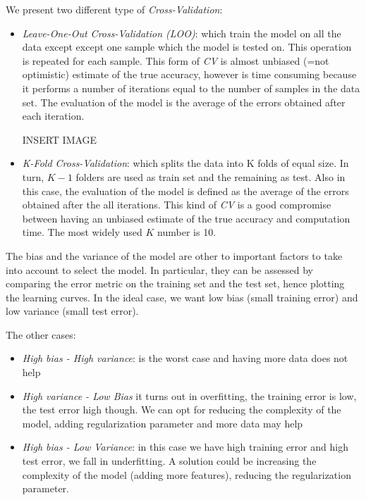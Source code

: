 We present two different type of \emph{Cross-Validation}:
\begin{itemize}
\item \emph{Leave-One-Out Cross-Validation (LOO)}: which train the model on all the data except except one sample which the model is tested on. This operation is repeated for each sample. This form of \emph{CV}  is almost unbiased (=not optimistic) estimate of the true accuracy, however is time consuming because it performs a number of iterations equal to the number of samples in the data set. The evaluation of the model is the average of the errors obtained after each iteration.

INSERT IMAGE

\item \emph{K-Fold Cross-Validation}: which splits the data into K folds of equal size. In turn, $K-1$ folders are used as train set and the remaining as test. Also in this case, the evaluation of the model is defined as the average of the errors obtained after the all iterations. This kind of \emph{CV} is a good compromise between having an unbiased estimate of the true accuracy and computation time. The most widely used $K$ number is 10.

\end{itemize}

The bias and the variance of the model are other to important factors to take into account to select the model. In particular, they can be assessed by comparing the error metric on the training set and the test set, hence plotting the learning curves. In the ideal case, we want low bias (small training error) and low variance (small test error).

The other cases:
\begin{itemize}
\item \emph{High bias - High variance}: is the worst case and having more data does not help

\item \emph{High variance - Low Bias} it turns out in overfitting, the training error is low, the test error high though. We can opt for reducing the complexity of the model, adding regularization parameter and more data may help

\item \emph{High bias - Low Variance}: in this case we have high training error and high test error, we fall in underfitting. A solution could be increasing the complexity of the model (adding more features), reducing the regularization parameter.
\end{itemize}

